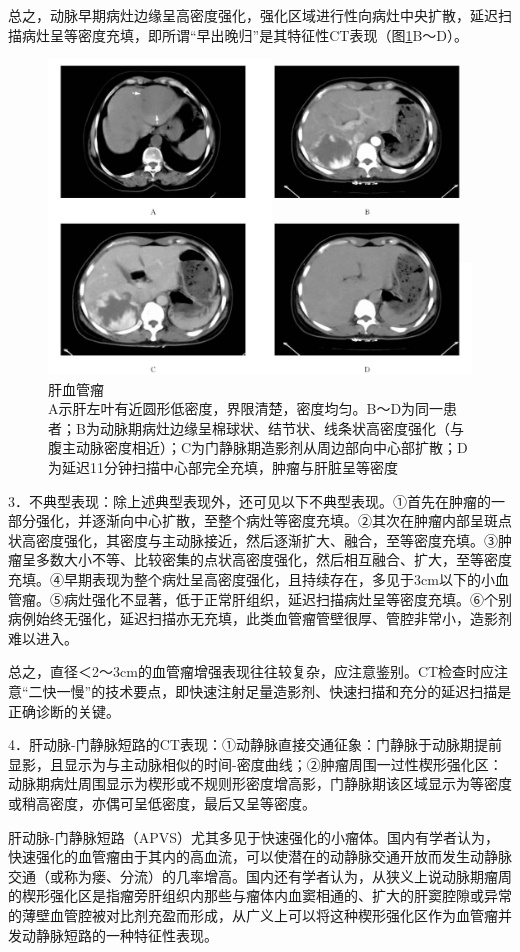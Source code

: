 总之，动脉早期病灶边缘呈高密度强化，强化区域进行性向病灶中央扩散，延迟扫描病灶呈等密度充填，即所谓“早出晚归”是其特征性CT表现（图\ref{fig11-8}B～D）。

\begin{figure}[!htbp]
 \centering
 \includegraphics[width=.7\textwidth,height=\textheight,keepaspectratio]{./images/Image00279.jpg}
 \captionsetup{justification=centering}
 \caption{肝血管瘤\\{\small A示肝左叶有近圆形低密度，界限清楚，密度均匀。B～D为同一患者；B为动脉期病灶边缘呈棉球状、结节状、线条状高密度强化（与腹主动脉密度相近）；C为门静脉期造影剂从周边部向中心部扩散；D为延迟11分钟扫描中心部完全充填，肿瘤与肝脏呈等密度}}
 \label{fig11-8}
  \end{figure} 

3．不典型表现：除上述典型表现外，还可见以下不典型表现。①首先在肿瘤的一部分强化，并逐渐向中心扩散，至整个病灶等密度充填。②其次在肿瘤内部呈斑点状高密度强化，其密度与主动脉接近，然后逐渐扩大、融合，至等密度充填。③肿瘤呈多数大小不等、比较密集的点状高密度强化，然后相互融合、扩大，至等密度充填。④早期表现为整个病灶呈高密度强化，且持续存在，多见于3cm以下的小血管瘤。⑤病灶强化不显著，低于正常肝组织，延迟扫描病灶呈等密度充填。⑥个别病例始终无强化，延迟扫描亦无充填，此类血管瘤管壁很厚、管腔非常小，造影剂难以进入。

总之，直径＜2～3cm的血管瘤增强表现往往较复杂，应注意鉴别。CT检查时应注意“二快一慢”的技术要点，即快速注射足量造影剂、快速扫描和充分的延迟扫描是正确诊断的关键。

4．肝动脉-门静脉短路的CT表现：①动静脉直接交通征象：门静脉于动脉期提前显影，且显示为与主动脉相似的时间-密度曲线；②肿瘤周围一过性楔形强化区：动脉期病灶周围显示为楔形或不规则形密度增高影，门静脉期该区域显示为等密度或稍高密度，亦偶可呈低密度，最后又呈等密度。

肝动脉-门静脉短路（APVS）尤其多见于快速强化的小瘤体。国内有学者认为，快速强化的血管瘤由于其内的高血流，可以使潜在的动静脉交通开放而发生动静脉交通（或称为瘘、分流）的几率增高。国内还有学者认为，从狭义上说动脉期瘤周的楔形强化区是指瘤旁肝组织内那些与瘤体内血窦相通的、扩大的肝窦腔隙或异常的薄壁血管腔被对比剂充盈而形成，从广义上可以将这种楔形强化区作为血管瘤并发动静脉短路的一种特征性表现。

